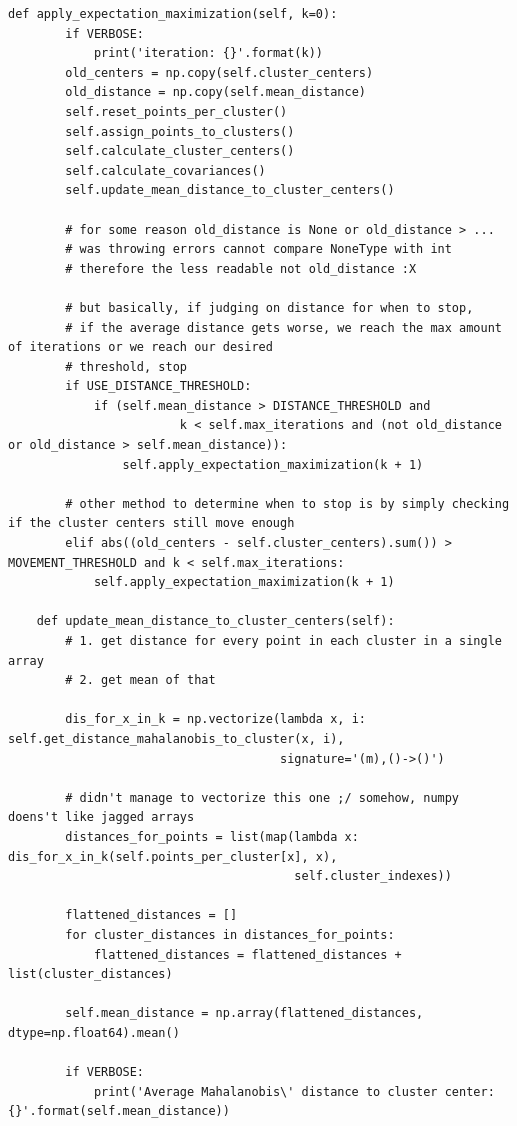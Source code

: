 \begin{lstlisting}[style=py]
    def apply_expectation_maximization(self, k=0):
        if VERBOSE:
            print('iteration: {}'.format(k))
        old_centers = np.copy(self.cluster_centers)
        old_distance = np.copy(self.mean_distance)
        self.reset_points_per_cluster()
        self.assign_points_to_clusters()
        self.calculate_cluster_centers()
        self.calculate_covariances()
        self.update_mean_distance_to_cluster_centers()

        # for some reason old_distance is None or old_distance > ...
        # was throwing errors cannot compare NoneType with int
        # therefore the less readable not old_distance :X

        # but basically, if judging on distance for when to stop,
        # if the average distance gets worse, we reach the max amount of iterations or we reach our desired
        # threshold, stop
        if USE_DISTANCE_THRESHOLD:
            if (self.mean_distance > DISTANCE_THRESHOLD and
                        k < self.max_iterations and (not old_distance or old_distance > self.mean_distance)):
                self.apply_expectation_maximization(k + 1)

        # other method to determine when to stop is by simply checking if the cluster centers still move enough
        elif abs((old_centers - self.cluster_centers).sum()) > MOVEMENT_THRESHOLD and k < self.max_iterations:
            self.apply_expectation_maximization(k + 1)

    def update_mean_distance_to_cluster_centers(self):
        # 1. get distance for every point in each cluster in a single array
        # 2. get mean of that

        dis_for_x_in_k = np.vectorize(lambda x, i: self.get_distance_mahalanobis_to_cluster(x, i),
                                      signature='(m),()->()')

        # didn't manage to vectorize this one ;/ somehow, numpy doens't like jagged arrays
        distances_for_points = list(map(lambda x: dis_for_x_in_k(self.points_per_cluster[x], x),
                                        self.cluster_indexes))

        flattened_distances = []
        for cluster_distances in distances_for_points:
            flattened_distances = flattened_distances + list(cluster_distances)

        self.mean_distance = np.array(flattened_distances, dtype=np.float64).mean()

        if VERBOSE:
            print('Average Mahalanobis\' distance to cluster center: {}'.format(self.mean_distance))


\end{lstlisting}
